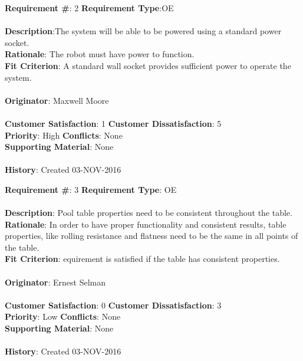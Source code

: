 \documentclass[titlepage]{article}
\begin{document}
\begin{framed}
	\noindent\textbf{Requirement \#}: 2 \hfill \textbf{Requirement Type}:OE \hfill\\\\
	\noindent\textbf{Description}:The system will be able to be powered using a standard power socket.\\
	\textbf{Rationale}: The robot must have power to function.\\
	\textbf{Fit Criterion}: A standard wall socket provides sufficient power to operate the system.\\\\
	\textbf{Originator}: Maxwell Moore\\\\
	\noindent\textbf{Customer Satisfaction}: 1 \hfill 	\textbf{Customer Dissatisfaction}: 5 \hfill\\
	\textbf{Priority}: High \hfill \textbf{Conflicts}: None \hfill\\
	\textbf{Supporting Material}: None\\\\
	\noindent\textbf{History}: Created 03-NOV-2016
\end{framed}

\begin{framed}
	\noindent\textbf{Requirement \#}: 3 \hfill \textbf{Requirement Type}: OE\hfill\\\\
	\noindent\textbf{Description}: Pool table properties need to be consistent throughout the table. \\
	\textbf{Rationale}: In order to have proper functionality and consistent results, table properties, like rolling resistance and flatness need to be the same in all points of the table. \\
	\textbf{Fit Criterion}: equirement is satisfied if the table has consistent properties. \\\\
	\textbf{Originator}: Ernest Selman\\\\
	\noindent\textbf{Customer Satisfaction}: 0 \hfill 	\textbf{Customer Dissatisfaction}: 3 \hfill\\
	\textbf{Priority}: Low \hfill \textbf{Conflicts}: None \hfill\\
	\textbf{Supporting Material}: None\\\\
	\noindent\textbf{History}: Created 03-NOV-2016
\end{framed}
\end{document}
